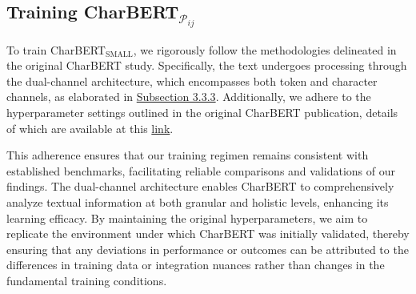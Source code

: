 \subsection{Training CharBERT$_{\mathcal{P}_{ij}}$}
\label{subsec:3_training_charbert_pij}
To train CharBERT$_{\text{SMALL}}$, we rigorously follow the methodologies delineated in the original CharBERT study. Specifically, the text undergoes processing through the dual-channel architecture, which encompasses both token and character channels, as elaborated in \href{subsec:3_corrector_charbert}{Subsection 3.3.3}. Additionally, we adhere to the hyperparameter settings outlined in the original CharBERT publication, details of which are available at this \href{https://github.com/mawentao277/CharBERT}{link}.

This adherence ensures that our training regimen remains consistent with established benchmarks, facilitating reliable comparisons and validations of our findings. The dual-channel architecture enables CharBERT to comprehensively analyze textual information at both granular and holistic levels, enhancing its learning efficacy. By maintaining the original hyperparameters, we aim to replicate the environment under which CharBERT was initially validated, thereby ensuring that any deviations in performance or outcomes can be attributed to the differences in training data or integration nuances rather than changes in the fundamental training conditions.